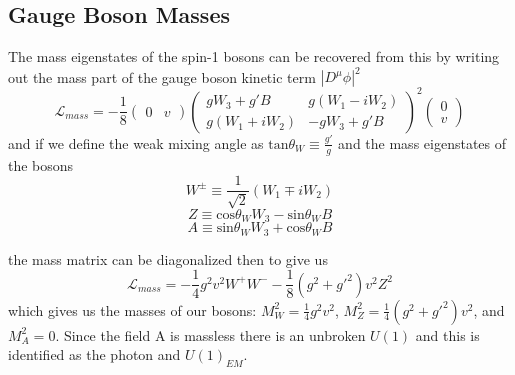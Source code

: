\subsection{Gauge Boson Masses}
The mass eigenstates of the spin-1 bosons can be recovered from this by writing out the mass part of the gauge boson kinetic term $|D^\mu \phi|^2$
\[ \mathcal{L}_{mass} = -\frac{1}{8}\begin{pmatrix} 0 & v\end{pmatrix}\begin{pmatrix}gW_3+g' B & g(W_1 -iW_2)\\g(W_1+iW_2) & -gW_3+g'B\end{pmatrix}^2\begin{pmatrix}0\\v\end{pmatrix}
\]
and if we define the weak mixing angle as $\text{tan}\theta_W \equiv \frac{g'}{g}$ and the mass eigenstates of the bosons
\[W^\pm\equiv\frac{1}{\sqrt{2}}(W_1\mp iW_2)\]
\[Z \equiv \text{cos}\theta_W W_3 -\text{sin}\theta_W B\]
\[A \equiv \text{sin}\theta_W W_3 +\text{cos}\theta_W B\]

the mass matrix can be diagonalized then to give us
\[ \mathcal{L}_{mass} = -\frac{1}{4} g^2 v^2 W^+ W^- -\frac{1}{8}(g^2 + g'^2)v^2 Z^2 \]
which gives us the masses of our bosons: $M_W^2 = \frac{1}{4}g^2 v^2$, $M_Z^2=\frac{1}{4}(g^2 +g'^2)v^2$, and $M_A^2=0$.  Since the field A is massless there is an unbroken $U(1)$ and this is identified as the photon and $U(1)_{EM}$.

